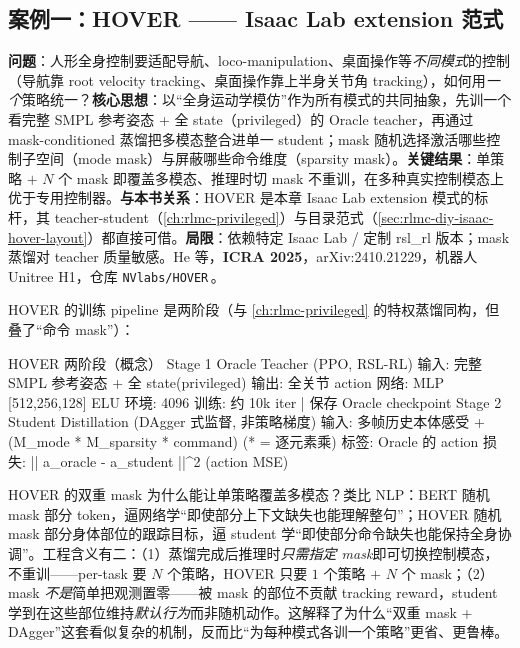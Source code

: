 \subsection{案例一：HOVER —— Isaac Lab extension 范式}
\label{sec:rlmc-diy-hover}

\begin{paper}\label{paper:rlmc-diy-hover}
\textbf{问题}：人形全身控制要适配导航、loco-manipulation、桌面操作等\emph{不同模式}的控制（导航靠 root velocity tracking、桌面操作靠上半身关节角 tracking），如何用\emph{一个}策略统一？\textbf{核心思想}：以“全身运动学模仿”作为所有模式的共同抽象，先训一个看完整 SMPL 参考姿态 + 全 state（privileged）的 Oracle teacher，再通过 mask-conditioned 蒸馏把多模态整合进单一 student；mask 随机选择激活哪些控制子空间（mode mask）与屏蔽哪些命令维度（sparsity mask）。\textbf{关键结果}：单策略 $+$ $N$ 个 mask 即覆盖多模态、推理时切 mask 不重训，在多种真实控制模态上优于专用控制器。\textbf{与本书关系}：HOVER 是本章 Isaac Lab extension 模式的标杆，其 teacher-student（\cref{ch:rlmc-privileged}）与目录范式（\cref{sec:rlmc-diy-isaac-hover-layout}）都直接可借。\textbf{局限}：依赖特定 Isaac Lab / 定制 rsl\_rl 版本；mask 蒸馏对 teacher 质量敏感。He 等，\textbf{ICRA 2025}，arXiv:2410.21229，机器人 Unitree H1，仓库 \texttt{NVlabs/\allowbreak HOVER}\,\cite{he2025hover}。
\end{paper}

HOVER 的训练 pipeline 是两阶段（与 \cref{ch:rlmc-privileged} 的特权蒸馏同构，但叠了“命令 mask”）：

\begin{codebox}[text]{HOVER 两阶段（概念）}
Stage 1  Oracle Teacher (PPO, RSL-RL)
  输入: 完整 SMPL 参考姿态 + 全 state(privileged)   输出: 全关节 action
  网络: MLP [512,256,128] ELU   环境: 4096   训练: 约 10k iter
        | 保存 Oracle checkpoint
Stage 2  Student Distillation (DAgger 式监督, 非策略梯度)
  输入: 多帧历史本体感受 + (M_mode * M_sparsity * command)   (* = 逐元素乘)
  标签: Oracle 的 action       损失: || a_oracle - a_student ||^2  (action MSE)
\end{codebox}

\begin{insight}\label{ins:rlmc-diy-hovermask}
HOVER 的双重 mask 为什么能让单策略覆盖多模态？类比 NLP：BERT 随机 mask 部分 token，逼网络学“即使部分上下文缺失也能理解整句”；HOVER 随机 mask 部分身体部位的跟踪目标，逼 student 学“即使部分命令缺失也能保持全身协调”。工程含义有二：（1）蒸馏完成后推理时\emph{只需指定 mask}即可切换控制模态，不重训——per-task 要 $N$ 个策略，HOVER 只要 $1$ 个策略 $+$ $N$ 个 mask；（2）mask \emph{不是}简单把观测置零——被 mask 的部位不贡献 tracking reward，student 学到在这些部位维持\emph{默认行为}而非随机动作。这解释了为什么“双重 mask + DAgger”这套看似复杂的机制，反而比“为每种模式各训一个策略”更省、更鲁棒。
\end{insight}

